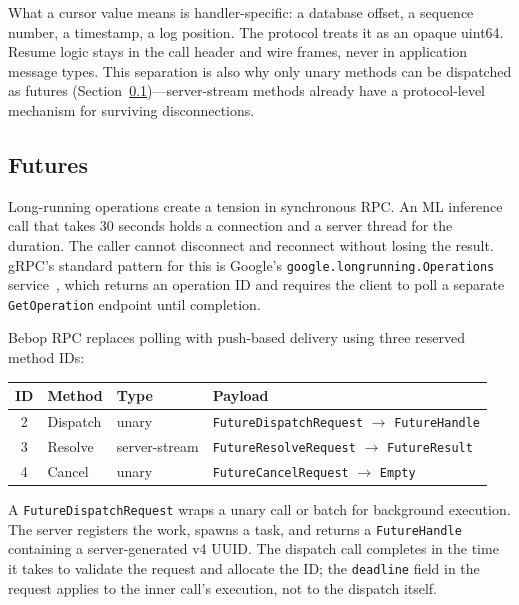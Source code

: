\documentclass[10pt,onecolumn]{article}
\begin{document}
What a cursor value means is handler-specific: a database offset, a sequence number, a timestamp, a log position. The protocol treats it as an opaque uint64. Resume logic stays in the call header and wire frames, never in application message types. This separation is also why only unary methods can be dispatched as futures (Section~\ref{sec:futures})---server-stream methods already have a protocol-level mechanism for surviving disconnections.

\subsection{Futures}
\label{sec:futures}

Long-running operations create a tension in synchronous RPC. An ML inference call that takes 30 seconds holds a connection and a server thread for the duration. The caller cannot disconnect and reconnect without losing the result. gRPC's standard pattern for this is Google's \texttt{google.longrunning.Operations} service~\cite{google-lro}, which returns an operation ID and requires the client to poll a separate \texttt{GetOperation} endpoint until completion.

Bebop RPC replaces polling with push-based delivery using three reserved method IDs:

\begin{table}[H]
\centering
\small
\begin{tabular}{@{}clll@{}}
\toprule
\textbf{ID} & \textbf{Method} & \textbf{Type} & \textbf{Payload} \\
\midrule
2 & Dispatch & unary & \texttt{FutureDispatchRequest} $\to$ \texttt{FutureHandle} \\
3 & Resolve & server-stream & \texttt{FutureResolveRequest} $\to$ \texttt{FutureResult} \\
4 & Cancel & unary & \texttt{FutureCancelRequest} $\to$ \texttt{Empty} \\
\bottomrule
\end{tabular}
\end{table}

\noindent A \texttt{FutureDispatchRequest} wraps a unary call or batch for background execution. The server registers the work, spawns a task, and returns a \texttt{FutureHandle} containing a server-generated v4 UUID. The dispatch call completes in the time it takes to validate the request and allocate the ID; the \texttt{deadline} field in the request applies to the inner call's execution, not to the dispatch itself.
\end{document}
